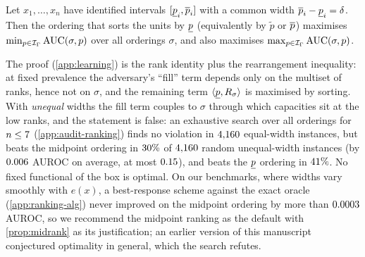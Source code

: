 \begin{proposition}
\label{prop:midrank}
Let $x_1,\dots,x_n$ have identified intervals $[\underline{p}_i,\overline{p}_i]$ with a common
width $\overline{p}_i-\underline{p}_i=\delta$. Then the ordering that sorts the units by
$\underline{p}$ (equivalently by $\tilde p$ or $\overline{p}$) maximises
$\min_{p\in\mathcal{I}_\Gamma}\operatorname{AUC}(\sigma,p)$ over all orderings $\sigma$, and also
maximises $\max_{p\in\mathcal{I}_\Gamma}\operatorname{AUC}(\sigma,p)$.
\end{proposition}

The proof (\cref{app:learning}) is the rank identity plus the rearrangement
inequality: at fixed prevalence the adversary's ``fill'' term depends only on
the multiset of ranks, hence not on $\sigma$, and the remaining term
$\langle\underline{p},R_\sigma\rangle$ is maximised by sorting. With \emph{unequal}
widths the fill term couples to $\sigma$ through which capacities sit at the
low ranks, and the statement is false: an exhaustive search over all
orderings for $n\le7$ (\cref{app:audit-ranking}) finds no violation
in $4{,}160$ equal-width instances, but beats the midpoint
ordering in $30\%$ of $4{,}160$ random
unequal-width instances (by $0.006$ AUROC on average, at most
$0.15$), and beats the $\underline{p}$ ordering in
$41\%$. No fixed functional of the box is optimal. On our benchmarks, where widths
vary smoothly with $e(x)$, a best-response scheme against the exact oracle
(\cref{app:ranking-alg}) never improved on the midpoint ordering by more than
$0.0003$ AUROC, so we recommend the midpoint ranking as the
default with \cref{prop:midrank} as its justification; an earlier version of
this manuscript conjectured optimality in general, which the search refutes.
